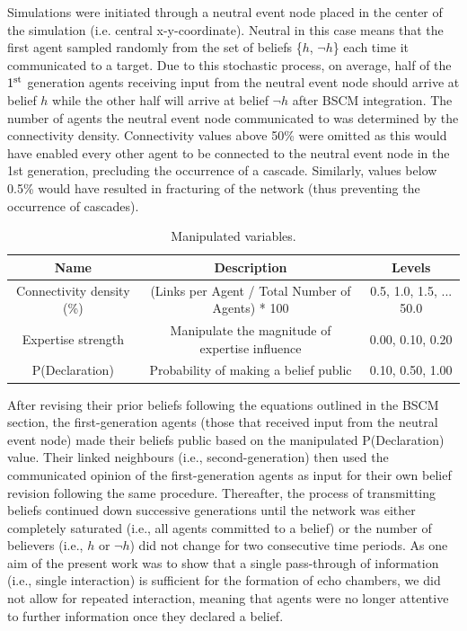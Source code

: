 \documentclass[doc,floatsintext]{apa6}
\begin{document}
Simulations were initiated through a neutral event node placed in the center of the simulation (i.e. central x-y-coordinate). Neutral in this case means that the first agent sampled randomly from the set of beliefs \{\(h\), \(\neg h\)\} each time it communicated to a target. Due to this stochastic process, on average, half of the \(1\textsuperscript{st}\) generation agents receiving input from the neutral event node should arrive at belief \(h\) while the other half will arrive at belief \(\neg h\) after BSCM integration. The number of agents the neutral event node communicated to was determined by the connectivity density. Connectivity values above 50\% were omitted as this would have enabled every other agent to be connected to the neutral event node in the 1st generation, precluding the occurrence of a cascade. Similarly, values below 0.5\% would have resulted in fracturing of the network (thus preventing the occurrence of cascades).

\begin{table}[!h]
\footnotesize
\begin{center} 
\caption{Manipulated variables.} 
\label{sample-table} 
\vskip 0.10in
\begin{tabular}{c c c} 
\hline
Name & Description & Levels\\
\hline
Connectivity density (\%) & (Links per Agent / Total Number of Agents) * 100 & 0.5, 1.0, 1.5, ... 50.0\\
Expertise strength & Manipulate the magnitude of expertise influence & 0.00, 0.10, 0.20\\
P(Declaration) & Probability of making a belief public & 0.10, 0.50, 1.00\\
\hline
\end{tabular} 
\end{center} 
\end{table}

After revising their prior beliefs following the equations outlined in the BSCM section, the first-generation agents (those that received input from the neutral event node) made their beliefs public based on the manipulated P(Declaration) value. Their linked neighbours (i.e., second-generation) then used the communicated opinion of the first-generation agents as input for their own belief revision following the same procedure. Thereafter, the process of transmitting beliefs continued down successive generations until the network was either completely saturated (i.e., all agents committed to a belief) or the number of believers (i.e., \(h\) or \(\neg h\)) did not change for two consecutive time periods. As one aim of the present work was to show that a single pass-through of information (i.e., single interaction) is sufficient for the formation of echo chambers, we did not allow for repeated interaction, meaning that agents were no longer attentive to further information once they declared a belief.
\end{document}
